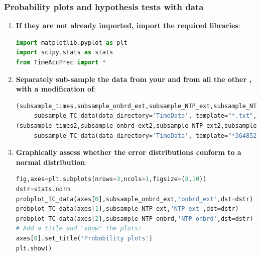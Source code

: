 \subsubsection{\howto Probability plots and hypothesis tests with \rtc data}
\begin{enumerate}
	\item \textbf{If they are not already imported, import the required \python libraries}:
\begin{lstlisting}[language=Python]
import matplotlib.pyplot as plt
import scipy.stats as stats
from TimeAccPrec import * 
\end{lstlisting}
	\item \textbf{Separately sub-sample the data from your \rtc and from all the other \rtcs, with a modification of}:
\begin{lstlisting}[language=Python]
(subsample_times,subsample_onbrd_ext,subsample_NTP_ext,subsample_NTP_onbrd)= \
     subsample_TC_data(data_directory='TimeData', template="*.txt",sub_samples=[0,3,6,9,12],exclude='3648523')
(subsample_times2,subsample_onbrd_ext2,subsample_NTP_ext2,subsample_NTP_onbrd2)= \
     subsample_TC_data(data_directory='TimeData', template="*3648523*.txt",sub_samples=[0,3,6,9,12])
\end{lstlisting}
	\item \textbf{Graphically assess whether the error distributions conform to a normal distribution}:
\begin{lstlisting}[language=Python]
fig,axes=plt.subplots(nrows=3,ncols=1,figsize=(8,10))
dstr=stats.norm
probplot_TC_data(axes[0],subsample_onbrd_ext,'onbrd_ext',dst=dstr)
probplot_TC_data(axes[1],subsample_NTP_ext,'NTP_ext',dst=dstr)
probplot_TC_data(axes[2],subsample_NTP_onbrd,'NTP_onbrd',dst=dstr)
# Add a title and "show" the plots:
axes[0].set_title('Probability plots')
plt.show()
\end{lstlisting}
	\begin{marginfigure}[-19.cm]
	\begin{center}

\end{center}
\end{marginfigure}
\end{enumerate}
